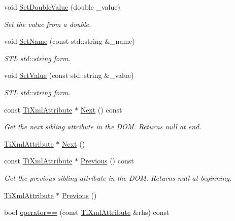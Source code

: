 \begin{DoxyCompactItemize}
void \hyperlink{class_ti_xml_attribute_a0316da31373496c4368ad549bf711394}{Set\+Double\+Value} (double \+\_\+value)
\begin{DoxyCompactList}\small\item\em Set the value from a double. \end{DoxyCompactList}\item 
void \hyperlink{class_ti_xml_attribute_ab296ff0c9a8c701055cd257a8a976e57}{Set\+Name} (const std\+::string \&\+\_\+name)
\begin{DoxyCompactList}\small\item\em S\+TL std\+::string form. \end{DoxyCompactList}\item 
void \hyperlink{class_ti_xml_attribute_ab43f67a0cc3ec1d80e62606500f0925f}{Set\+Value} (const std\+::string \&\+\_\+value)
\begin{DoxyCompactList}\small\item\em S\+TL std\+::string form. \end{DoxyCompactList}\item 
const \hyperlink{class_ti_xml_attribute}{Ti\+Xml\+Attribute} $\ast$ \hyperlink{class_ti_xml_attribute_af2e78f1ba9ed56a26ddc80614ed1c393}{Next} () const
\begin{DoxyCompactList}\small\item\em Get the next sibling attribute in the D\+OM. Returns null at end. \end{DoxyCompactList}\item 
\hyperlink{class_ti_xml_attribute}{Ti\+Xml\+Attribute} $\ast$ \hyperlink{class_ti_xml_attribute_a138320aa7793b148ba7e5bd0a0ea4db6}{Next} ()
\item 
const \hyperlink{class_ti_xml_attribute}{Ti\+Xml\+Attribute} $\ast$ \hyperlink{class_ti_xml_attribute_afc7bbfdf83d59fbc4ff5e283d27b5d7d}{Previous} () const
\begin{DoxyCompactList}\small\item\em Get the previous sibling attribute in the D\+OM. Returns null at beginning. \end{DoxyCompactList}\item 
\hyperlink{class_ti_xml_attribute}{Ti\+Xml\+Attribute} $\ast$ \hyperlink{class_ti_xml_attribute_ae4dabc932cba945ed1e92fec5f121193}{Previous} ()
\item 
bool \hyperlink{class_ti_xml_attribute_a51eef33c2cdd55831447af46be0baf8b}{operator==} (const \hyperlink{class_ti_xml_attribute}{Ti\+Xml\+Attribute} \&rhs) const
\item 

\end{DoxyCompactItemize}
